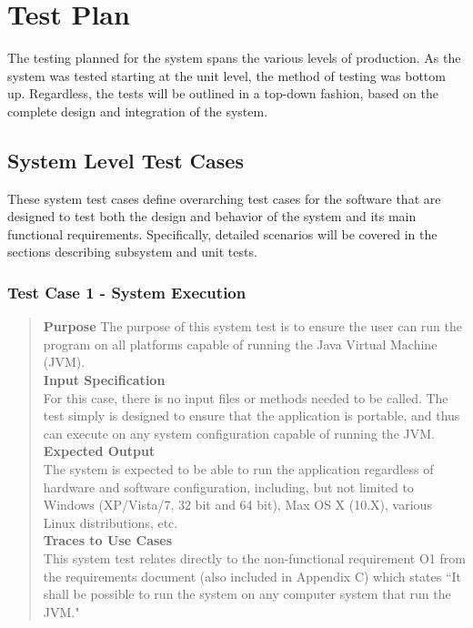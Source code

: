 \documentclass[12pt]{article}
\begin{document}
\section{Test Plan}

{
The testing planned for the system spans the various levels of production. As the system was tested starting at the unit level, the method of testing was bottom up. Regardless, the tests will be outlined in a top-down fashion, based on the complete design and integration of the system. \\
}

\subsection{System Level Test Cases}
{
These system test cases define overarching test cases for the software that are designed to test both the design and behavior of the system and its main functional requirements. Specifically, detailed scenarios will be covered in the sections describing subsystem and unit tests.
}
\subsubsection{Test Case 1 - System Execution}
\begin{quote}
{\bf Purpose}
{
The purpose of this system test is to ensure the user can run the program on all platforms capable of running the Java Virtual Machine (JVM).
}
\\
{\bf Input Specification}
\\
{
For this case, there is no input files or methods needed to be called. The test simply is designed to ensure that the application is portable, and thus can execute on any system configuration capable of running the JVM.
}
\\
{\bf Expected Output}
\\
{
The system is expected to be able to run the application regardless of hardware and software configuration, including, but not limited to Windows (XP/Vista/7, 32 bit and 64 bit), Max OS X (10.X), various Linux distributions, etc.
}
\\
{\bf Traces to Use Cases}
\\
{
This system test relates directly to the non-functional requirement O1 from the requirements document (also included in Appendix C) which states ``It shall be possible to run the system on any computer system that run the JVM."
}
\end{quote}
\end{document}

